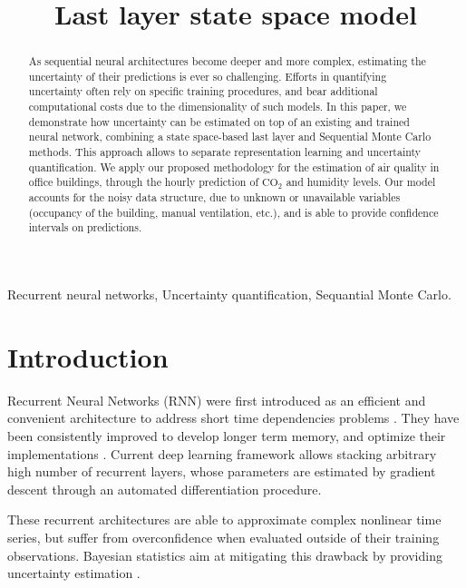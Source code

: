 \documentclass{article}
\title{Last layer state space model}
\begin{document}
\maketitle

\begin{abstract}
	As sequential neural architectures become deeper and more complex, estimating the uncertainty of their predictions is ever so challenging.
	Efforts in quantifying uncertainty often rely on specific training procedures, and bear additional computational costs due to the dimensionality of such models.
	In this paper, we demonstrate how uncertainty can be estimated on top of an existing and trained neural network, combining a state space-based last  layer and  Sequential Monte Carlo methods. This approach allows to separate representation learning and uncertainty quantification. We apply our proposed methodology for the estimation of air quality in office buildings, through the hourly prediction of \ensuremath{\mathrm{CO_2}} and humidity levels.
	Our model accounts for the noisy data structure, due to unknown or unavailable variables (occupancy of the building, manual ventilation, etc.), and is able to provide confidence intervals on predictions.
\end{abstract}

\begin{keywords}
Recurrent neural networks, Uncertainty quantification, Sequantial Monte Carlo.
\end{keywords}

\section{Introduction}
\label{sec:intro}

Recurrent Neural Networks (RNN) were first introduced as an efficient and convenient architecture to address short time dependencies problems \cite{Mozer1989AFB}.
They have been consistently improved to develop longer term memory, and optimize their implementations \cite{Bengio1994LearningLD,Hochreiter1997LongSM,Cho2014LearningPR}.
Current deep learning framework allows stacking arbitrary high number of recurrent layers, whose parameters are estimated by gradient descent through an automated differentiation procedure.

These recurrent architectures are able to approximate complex nonlinear time series, but suffer from overconfidence when evaluated outside of their training observations. Bayesian statistics aim at mitigating this drawback by providing uncertainty estimation \cite{Hinton1995BayesianLF,MacKay1992}.
\end{document}

